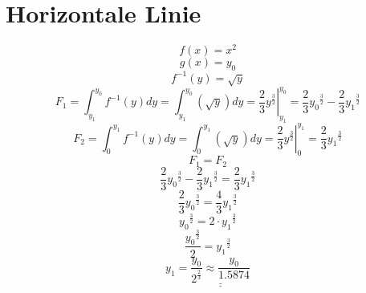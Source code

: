 \section{Horizontale Linie}
\[ f(x) = x^2 \]
\[ g(x) = y_0 \]
\[ f^{-1}(y) = \sqrt{y} \]
\[ F_1 = \int_{y_1}^{y_0} f^{-1}(y) dy = \int_{y_1}^{y_0} \left(\sqrt{y}\right) dy = \left.\frac{2}{3} y^{\frac{3}{2}}\right|_{y_1}^{y_0} = \frac{2}{3}{y_0}^{\frac{3}{2}} - \frac{2}{3}{y_1}^{\frac{3}{2}} \]
\[ F_2 = \int_{0}^{y_1} f^{-1}(y) dy = \int_{0}^{y_1} \left(\sqrt{y}\right) dy = \left.\frac{2}{3} y^{\frac{3}{2}}\right|_{0}^{y_1} = \frac{2}{3}{y_1}^{\frac{3}{2}} \]
\[ F_1 = F_2 \]
\[ \frac{2}{3}{y_0}^{\frac{3}{2}} - \frac{2}{3}{y_1}^{\frac{3}{2}} = \frac{2}{3}{y_1}^{\frac{3}{2}} \]
\[ \frac{2}{3}{y_0}^{\frac{3}{2}} = \frac{4}{3}{y_1}^{\frac{3}{2}} \]
\[ {y_0}^{\frac{3}{2}} = 2 \cdot {y_1}^{\frac{3}{2}} \]
\[ \frac{{y_0}^{\frac{3}{2}}}{2} = {y_1}^{\frac{3}{2}} \]
\[ y_1 = \underline{\underline{\frac{y_0}{2^{\frac{2}{3}}} \approx \frac{y_0}{1.5874}}} \]
\[  \]

